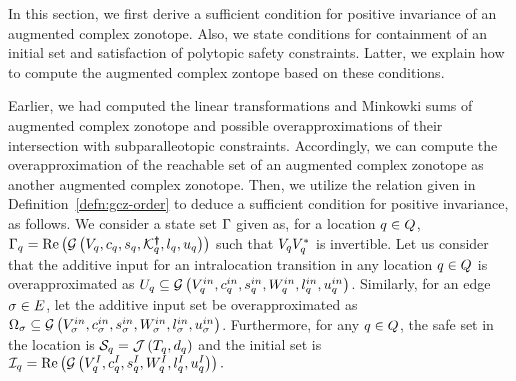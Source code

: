 In this section, we first derive a sufficient condition for positive
invariance of an augmented complex zonotope.  Also, we state
conditions for containment of an initial set and satisfaction of
polytopic safety constraints.  Latter, we explain how to compute the
augmented complex zontope based on these conditions.

Earlier, we had computed the linear transformations and Minkowki sums
of augmented complex zonotope and possible overapproximations of their
intersection with subparalleotopic constraints.  Accordingly, we can
compute the overapproximation of the reachable set of an augmented
complex zonotope as another augmented complex zonotope.  Then, we
utilize the relation given in Definition~\ref{defn:gcz-order} to
  deduce a sufficient condition for positive invariance, as follows.
%
We consider a state set $\Gamma$ given as, for a location
  $q\in Q$,
  $\Gamma_q=\operatorname{\operatorname{Re}}\left(\mathcal{G}\left(V_q,c_q,s_q,\mathcal{K}^{\bm{\dagger}}_q,l_q,u_q\right)\right)$
  such that $V_qV_q^*$ is invertible.
  Let us consider that the additive input for an intralocation
  transition in any location $q\in Q$ is overapproximated
  as
  $U_q\subseteq \mathcal{G}\left(V^{in}_q,c^{in}_q,s^{in}_q,W^{in}_q,l^{in}_q,u^{in}_q\right)$.
  Similarly, for an edge $\sigma\in E$, let the additive input
  set be
  overapproximated as
  $\Omega_\sigma\subseteq \mathcal{G}\left(V^{in}_\sigma,c^{in}_\sigma,s^{in}_\sigma,W^{in}_\sigma,l^{in}_\sigma,u^{in}_\sigma\right)$.
  Furthermore, for any $q\in Q$, the safe set in the
  location is $\mathcal{S}_q=\mathcal{J}\left(T_q,d_q\right)$ and the
  initial set is
  $\mathcal{I}_q=\operatorname{\operatorname{Re}}\left(\mathcal{G}\left(V^I_q,c^I_q,s^I_q,W^I_q,l^I_q,u^I_q\right)\right).$
  


